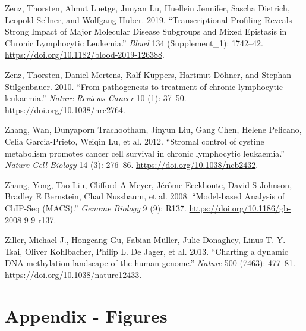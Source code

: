 \documentclass[11pt, a4paper, twosided]{book}
\newenvironment{CSLReferences}%
  {}%
  {\par}
\begin{document}
\begin{CSLReferences}{1}{0}
\leavevmode{}%
Zenz, Thorsten, Almut Luetge, Junyan Lu, Huellein Jennifer, Sascha Dietrich, Leopold Sellner, and Wolfgang Huber. 2019. {``{Transcriptional Profiling Reveals Strong Impact of Major Molecular Disease Subgroups and Mixed Epistasis in Chronic Lymphocytic Leukemia}.''} \emph{Blood} 134 (Supplement\_1): 1742--42. \url{https://doi.org/10.1182/blood-2019-126388}.

\leavevmode{}%
Zenz, Thorsten, Daniel Mertens, Ralf Küppers, Hartmut Döhner, and Stephan Stilgenbauer. 2010. {``{From pathogenesis to treatment of chronic lymphocytic leukaemia}.''} \emph{Nature Reviews Cancer} 10 (1): 37--50. \url{https://doi.org/10.1038/nrc2764}.

\leavevmode{}%
Zhang, Wan, Dunyaporn Trachootham, Jinyun Liu, Gang Chen, Helene Pelicano, Celia Garcia-Prieto, Weiqin Lu, et al. 2012. {``{Stromal control of cystine metabolism promotes cancer cell survival in chronic lymphocytic leukaemia}.''} \emph{Nature Cell Biology} 14 (3): 276--86. \url{https://doi.org/10.1038/ncb2432}.

\leavevmode{}%
Zhang, Yong, Tao Liu, Clifford A Meyer, Jérôme Eeckhoute, David S Johnson, Bradley E Bernstein, Chad Nussbaum, et al. 2008. {``{Model-based Analysis of ChIP-Seq (MACS)}.''} \emph{Genome Biology} 9 (9): R137. \url{https://doi.org/10.1186/gb-2008-9-9-r137}.

\leavevmode{}%
Ziller, Michael J., Hongcang Gu, Fabian Müller, Julie Donaghey, Linus T.-Y. Tsai, Oliver Kohlbacher, Philip L. De Jager, et al. 2013. {``{Charting a dynamic DNA methylation landscape of the human genome}.''} \emph{Nature} 500 (7463): 477--81. \url{https://doi.org/10.1038/nature12433}.

\end{CSLReferences}
\indent
\setlength{\parindent}{17pt}
\setlength{\leftskip}{0pt}
\setlength{\parskip}{0pt}

\newpage

\hypertarget{appendix-appendix}{%
\appendix}


\hypertarget{appendix---figures}{%
\chapter*{Appendix - Figures}\label{appendix---figures}}
\end{document}
